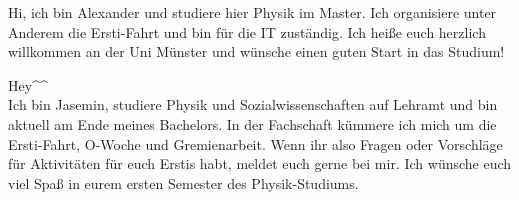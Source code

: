 \begin{multicols}{2}
\vspace{-0.8cm}

{
Hi, ich bin Alexander und studiere hier Physik im Master. Ich organisiere unter Anderem die Ersti-Fahrt und bin für die IT zuständig. 
Ich heiße euch herzlich willkommen an der Uni Münster und wünsche einen guten Start in das Studium!
}


{
Hey\textasciicircum\textasciicircum \\
Ich bin Jasemin, studiere Physik und Sozialwissenschaften auf Lehramt und bin aktuell am Ende meines Bachelors. In der Fachschaft kümmere ich mich um die Ersti-Fahrt, O-Woche und Gremienarbeit. Wenn ihr also Fragen oder Vorschläge für Aktivitäten für euch Erstis habt, meldet euch gerne bei mir. 
Ich wünsche euch viel Spaß in eurem ersten Semester des Physik-Studiums.
}

\vspace{-1.2cm}


\end{multicols}
